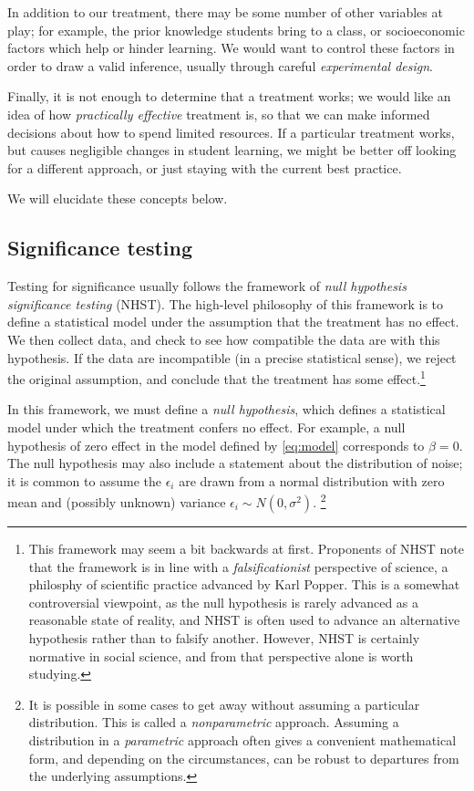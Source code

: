 \documentclass{tufte-handout}
\begin{document}
In addition to our treatment, there may be some number of other variables at
play; for example, the prior knowledge students bring to a class, or
socioeconomic factors which help or hinder learning. We would want to control
these factors in order to draw a valid inference, usually through careful
\emph{experimental design}.

Finally, it is not enough to determine that a treatment works; we would like an
idea of how \emph{practically effective} treatment is, so that we can make informed
decisions about how to spend limited resources. If a particular treatment works,
but causes negligible changes in student learning, we might be better off
looking for a different approach, or just staying with the current best
practice.


We will elucidate these concepts below.
\subsection{Significance testing}
\label{sec:org2289415}
Testing for significance usually follows the framework of \emph{null hypothesis
significance testing} (NHST). The high-level philosophy of this framework is to
define a statistical model under the assumption that the treatment has no
effect. We then collect data, and check to see how compatible the data are with
this hypothesis. If the data are incompatible (in a precise statistical sense),
we reject the original assumption, and conclude that the treatment has some
effect.\footnote{This framework may seem a bit backwards at first. Proponents of NHST
note that the framework is in line with a \emph{falsificationist} perspective of
science, a philosphy of scientific practice advanced by Karl
Popper.\cite{popper2005logic} This is a somewhat controversial viewpoint, as the
null hypothesis is rarely advanced as a reasonable state of reality, and NHST is
often used to advance an alternative hypothesis rather than to falsify another.
However, NHST is certainly normative in social science, and from that
perspective alone is worth studying.}

In this framework, we must define a \emph{null hypothesis}, which defines a
statistical model under which the treatment confers no effect. For example, a
null hypothesis of zero effect in the model defined by \eqref{eq:model}
corresponds to \(\beta=0\). The null hypothesis may also include a statement about
the distribution of noise; it is common to assume the \(\epsilon_i\) are drawn
from a normal distribution with zero mean and (possibly unknown) variance
\(\epsilon_i\sim N(0,\sigma^2)\). \footnote{It is possible in some cases to get away
without assuming a particular distribution. This is called a \emph{nonparametric}
approach. Assuming a distribution in a \emph{parametric} approach often gives a
convenient mathematical form, and depending on the circumstances, can be robust
to departures from the underlying assumptions.}
\end{document}
